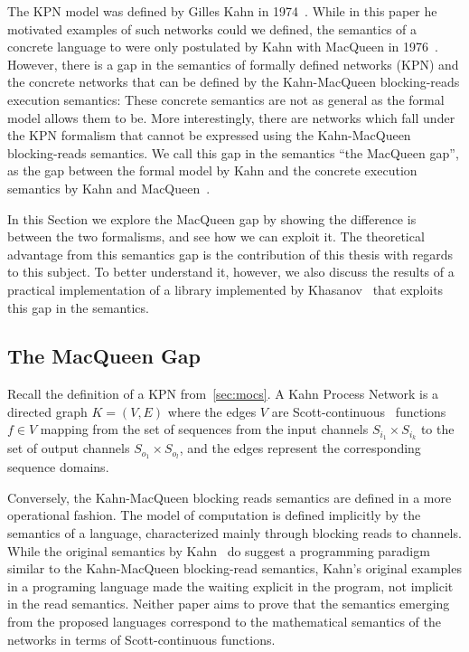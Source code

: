 The \ac{KPN} model was defined by Gilles Kahn in 1974~\cite{kahn74}.
While in this paper he motivated examples of such networks could we defined, the
semantics of a concrete language to were only postulated by Kahn with MacQueen
in 1976~\cite{kahn_macqueen}.
However, there is a gap in the semantics of formally defined networks (\ac{KPN})
and the concrete networks that can be defined by the Kahn-MacQueen
blocking-reads execution semantics: These concrete semantics are not as general
as the formal model allows them to be.
More interestingly, there are networks which fall under the \ac{KPN} formalism
that cannot be expressed using the Kahn-MacQueen blocking-reads semantics.
We call this gap in the semantics ``the MacQueen gap'', as the gap between the formal model by Kahn and the concrete execution semantics by Kahn and MacQueen~\cite{lee_matsikoudis_semantics,khasanov_parmaditam18}. 

In this Section we explore the MacQueen gap by showing the difference is between the two formalisms, and see how we can exploit it. The theoretical advantage from this semantics gap is the contribution of this thesis with regards to this subject. To better understand it, however, we also discuss the results of a practical implementation of a library implemented by Khasanov~\cite{khasanov_parmaditam18} that exploits this gap in the semantics. 

\subsection{The MacQueen Gap}

Recall the definition of a \ac{KPN} from~\ref{sec:mocs}.
A Kahn Process Network is a directed graph $K = (V,E)$ where the edges $V$ are Scott-continuous~\cite{scott1970} functions $f \in V$ mapping from the set of sequences from the input channels $S_{i_1} \times S_{i_k}$ to the set of output channels $S_{o_1} \times S_{o_l}$, and the edges represent the corresponding sequence domains.

Conversely, the Kahn-MacQueen blocking reads semantics are defined in a more operational fashion. The model of computation is defined implicitly by the semantics of a language\cite{kahn_macqueen}, characterized mainly through blocking reads to channels. While the original semantics by Kahn~\cite{kahn74} do suggest a programming paradigm similar to the Kahn-MacQueen blocking-read semantics, Kahn's original examples in a programing language made the waiting explicit in the program, not implicit in the read semantics. Neither paper aims to prove that the semantics emerging from the proposed languages correspond to the mathematical semantics of the networks in terms of Scott-continuous functions.

